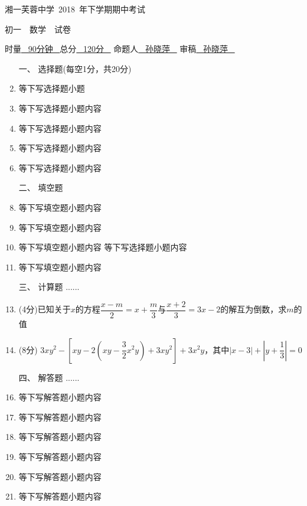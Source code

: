 \documentclass[12pt,landscape,UTF8,onecolumn]{ctexart}
\begin{document}
  \noindent	
  \begin{spacing}{1.5}
    \begin{center}
       \heiti 湘一芙蓉中学~2018~年下学期期中考试

      初一~~数学~~试卷

       时量\underline{~ 90分钟 ~}总分\underline{~ 120分 ~} 命题人\underline{~ 孙晓萍 ~} 审稿\underline{~ 孙晓萍 ~}
       \songti \vspace{2mm}
    
    \end{center}
  \end{spacing}
  \vspace{-10pt} 
  \begin{spacing}{1.3}
    \begin{enumerate} [1、]
      \item[\heiti 一、] {\heiti 选择题(每空1分，共20分)}
      \item 等下写选择题小题
      \item 等下写选择题小题内容 
      \item 等下写选择题小题内容 
      \item 等下写选择题小题内容 
      \item 等下写选择题小题内容 

      \item[\heiti 二、] { \heiti 填空题 }
      \item \tk{}等下写填空题小题内容 
      \item \tk{}等下写填空题小题内容 
      \item \tk{}等下写填空题小题内容 等下写选择题小题内容
      \item \tk{}等下写填空题小题内容

      \item[\heiti 三、] {\heiti 计算题  ......}
      \item (4分)已知关于$x$的方程$\dfrac {x-m}2=x+\dfrac m3$与$\dfrac {x+2}3=3x-2$的解互为倒数，求$m$的值
      \item (8分) $3xy^2-[xy-2(xy-\dfrac32x^2y)+3xy^2]+3x^2y$，其中$|x-3|+|y+\dfrac 13|=0$

      \item[\heiti 四、] {\heiti 解答题  ......}
      \item 等下写解答题小题内容 
      \item 等下写解答题小题内容 
      \item 等下写解答题小题内容 
      \item 等下写解答题小题内容 
      \item 等下写解答题小题内容 
      \item 等下写解答题小题内容 
    \end{enumerate} 
  \end{spacing}
\end{document}
